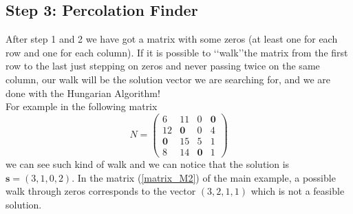 \documentclass[12pt]{ClasseMatematicamente}
\begin{document}
\subsection*{Step 3: Percolation Finder}

After step 1 and 2 we have got a matrix with some zeros (at least one for each row and one for each column). If it is possible to \lq\lq walk\rq\rq\phantom{z}the matrix from the first row to the last just stepping on zeros and never passing twice on the same column, our walk will be the solution vector we are searching for, and we are done with the Hungarian Algorithm!\\

\noindent
For example in the following matrix 
$$
N = 
\left(\begin{array}{rrrr}
6 & 11 & 0 & \mathbf{0} \\
12 & \mathbf{0} & 0 & 4 \\
\mathbf{0} & 15 & 5 & 1 \\
8 & 14 & \mathbf{0} & 1
\end{array}\right)
$$
we can see such kind of walk and we can notice that the solution is $\mathbf{s} = (3,1,0,2)$. In the matrix (\ref{matrix_M2}) of the main example, a possible walk through zeros corresponds to the vector $(3,2,1,1)$ which is not a feasible solution. \\
\end{document}
